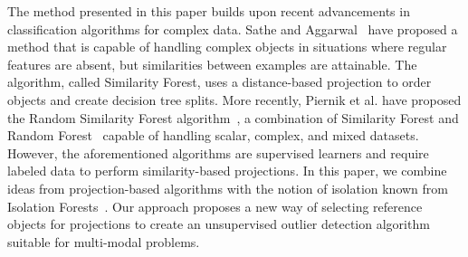 The method presented in this paper builds upon recent advancements in classification algorithms for complex data. Sathe and Aggarwal~\cite{sathe2017similarity} have proposed a method that is capable of handling complex objects in situations where regular features are absent, but similarities between examples are attainable. The algorithm, called Similarity Forest, uses a distance-based projection to order objects and create decision tree splits. More recently, Piernik et al. have proposed the Random Similarity Forest algorithm~\cite{piernik2022random}, a combination of Similarity Forest and Random Forest~\cite{breiman2001random} capable of handling scalar, complex, and mixed datasets. However, the aforementioned algorithms are supervised learners and require labeled data to perform similarity-based projections. In this paper, we combine ideas from projection-based algorithms with the notion of isolation known from Isolation Forests~\cite{liu2008isolation}. Our approach proposes a new way of selecting reference objects for projections to create an unsupervised outlier detection algorithm suitable for multi-modal problems.